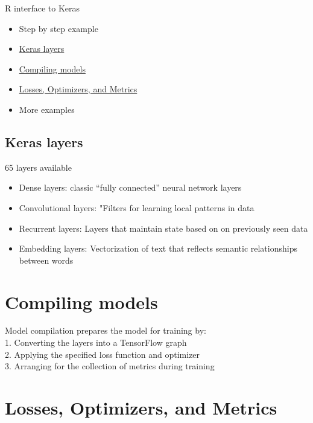 \documentclass[
]{book}
\providecommand{\tightlist}{%
  \setlength{\itemsep}{0pt}\setlength{\parskip}{0pt}}
\begin{document}
R interface to Keras

\begin{itemize}
\tightlist
\item
  Step by step example
\item
  \protect\hyperlink{keras-layers}{Keras layers}
\item
  \protect\hyperlink{compiling-models}{Compiling models}
\item
  \protect\hyperlink{losses-optimizers-and-metrics}{Losses, Optimizers, and Metrics}
\item
  More examples
\end{itemize}

\hypertarget{keras-layers}{%
\section{Keras layers}\label{keras-layers}}

65 layers available

\begin{itemize}
\tightlist
\item
  Dense layers: classic ``fully connected'' neural network layers
\item
  Convolutional layers: "Filters for learning local patterns in data
\item
  Recurrent layers: Layers that maintain state based on on previously seen data
\item
  Embedding layers: Vectorization of text that reflects semantic relationships between words
\end{itemize}

\hypertarget{compiling-models}{%
\chapter{Compiling models}\label{compiling-models}}

Model compilation prepares the model for training by:\\
1. Converting the layers into a TensorFlow graph\\
2. Applying the specified loss function and optimizer\\
3. Arranging for the collection of metrics during training

\hypertarget{losses-optimizers-and-metrics}{%
\chapter{Losses, Optimizers, and Metrics}\label{losses-optimizers-and-metrics}}
\end{document}
